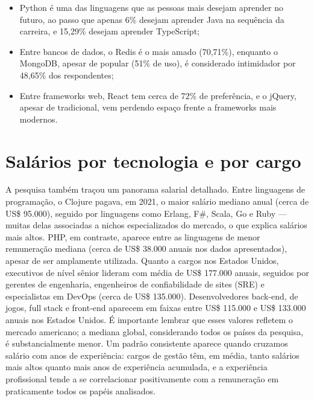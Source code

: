 \begin{itemize}
  \item Python é uma das linguagens que as pessoas mais desejam aprender no futuro, ao passo que apenas 6\% desejam aprender Java na sequência da carreira, e 15,29\% desejam aprender TypeScript;
\end{itemize}

\begin{itemize}
  \item Entre bancos de dados, o Redis é o mais amado (70,71\%), enquanto o MongoDB, apesar de popular (51\% de uso), é considerado intimidador por 48,65\% dos respondentes;
\end{itemize}

\begin{itemize}
  \item Entre frameworks web, React tem cerca de 72\% de preferência, e o jQuery, apesar de tradicional, vem perdendo espaço frente a frameworks mais modernos.
\end{itemize}

\section{Salários por tecnologia e por cargo}

A pesquisa também traçou um panorama salarial detalhado. Entre linguagens de programação, o Clojure pagava, em 2021, o maior salário mediano anual (cerca de US\$ 95.000), seguido por linguagens como Erlang, F\#, Scala, Go e Ruby — muitas delas associadas a nichos especializados do mercado, o que explica salários mais altos. PHP, em contraste, aparece entre as linguagens de menor remuneração mediana (cerca de US\$ 38.000 anuais nos dados apresentados), apesar de ser amplamente utilizada. Quanto a cargos nos Estados Unidos, executivos de nível sênior lideram com média de US\$ 177.000 anuais, seguidos por gerentes de engenharia, engenheiros de confiabilidade de sites (SRE) e especialistas em DevOps (cerca de US\$ 135.000). Desenvolvedores back-end, de jogos, full stack e front-end aparecem em faixas entre US\$ 115.000 e US\$ 133.000 anuais nos Estados Unidos. É importante lembrar que esses valores refletem o mercado americano; a mediana global, considerando todos os países da pesquisa, é substancialmente menor. Um padrão consistente aparece quando cruzamos salário com anos de experiência: cargos de gestão têm, em média, tanto salários mais altos quanto mais anos de experiência acumulada, e a experiência profissional tende a se correlacionar positivamente com a remuneração em praticamente todos os papéis analisados.

